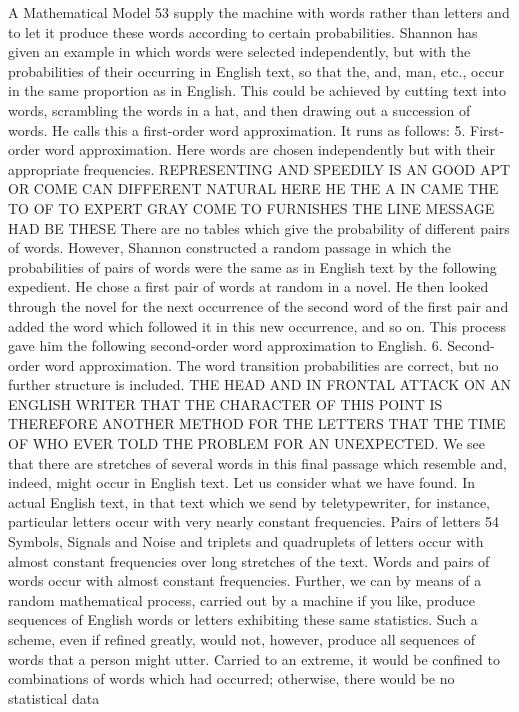 A Mathematical Model 53
supply the machine with words rather than letters and to let it
produce these words according to certain probabilities.
Shannon has given an example in which words were selected
independently, but with the probabilities of their occurring in
English text, so that the, and, man, etc., occur in the same proportion
as in English. This could be achieved by cutting text into
words, scrambling the words in a hat, and then drawing out a
succession of words. He calls this a first-order word approximation.
It runs as follows:
5. First-order word approximation. Here words are chosen independently
but with their appropriate frequencies.
REPRESENTING AND SPEEDILY IS AN GOOD APT
OR COME CAN DIFFERENT NATURAL HERE HE THE
A IN CAME THE TO OF TO EXPERT GRAY COME
TO FURNISHES THE LINE MESSAGE HAD BE THESE
There are no tables which give the probability of different pairs
of words. However, Shannon constructed a random passage in
which the probabilities of pairs of words were the same as in
English text by the following expedient. He chose a first pair of
words at random in a novel. He then looked through the novel for
the next occurrence of the second word of the first pair and added
the word which followed it in this new occurrence, and so on.
This process gave him the following second-order word approximation
to English.
6. Second-order word approximation. The word transition probabilities
are correct, but no further structure is included.
THE HEAD AND IN FRONTAL ATTACK ON AN
ENGLISH WRITER THAT THE CHARACTER OF THIS
POINT IS THEREFORE ANOTHER METHOD FOR THE
LETTERS THAT THE TIME OF WHO EVER TOLD THE
PROBLEM FOR AN UNEXPECTED.
We see that there are stretches of several words in this final
passage which resemble and, indeed, might occur in English text.
Let us consider what we have found. In actual English text, in
that text which we send by teletypewriter, for instance, particular
letters occur with very nearly constant frequencies. Pairs of letters
54
Symbols, Signals and Noise
and triplets and quadruplets of letters occur with almost constant
frequencies over long stretches of the text. Words and pairs of
words occur with almost constant frequencies. Further, we can by
means of a random mathematical process, carried out by a machine
if you like, produce sequences of English words or letters exhibiting
these same statistics.
Such a scheme, even if refined greatly, would not, however,
produce all sequences of words that a person might utter. Carried
to an extreme, it would be confined to combinations of words
which had occurred; otherwise, there would be no statistical data
